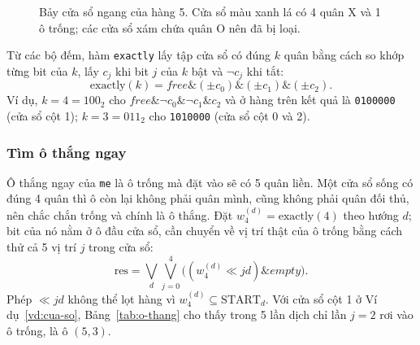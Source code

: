 \begin{figure}[H]
  \centering
  
  \caption{Bảy cửa sổ ngang của hàng 5. Cửa sổ màu xanh lá có 4 quân X và 1 ô trống; các cửa sổ xám chứa quân O nên đã bị loại.}
  \label{fig:cua-so}
\end{figure}

\begin{table}[H]
  \centering\small
  \caption{Các vòng cộng của \texttt{window\_counts} cho hàng 5, giá trị sau mỗi vòng. Mỗi chuỗi 7 ký tự là bit của 7 cửa sổ, cột 0 ở bên trái (không phải thứ tự viết số nhị phân thông thường).}
  \label{tab:cong}
  
\end{table}

Từ các bộ đếm, hàm \texttt{exactly} lấy tập cửa sổ có đúng $k$ quân bằng cách so khớp từng bit của $k$, lấy $c_j$ khi bit $j$ của $k$ bật và $\lnot c_j$ khi tắt:
\begin{equation}
  \mathrm{exactly}(k) = \mathit{free} \mathbin{\&} (\pm c_0) \mathbin{\&} (\pm c_1) \mathbin{\&} (\pm c_2).
\end{equation}
Ví dụ, $k = 4 = 100_2$ cho $\mathit{free} \mathbin{\&} \lnot c_0 \mathbin{\&} \lnot c_1 \mathbin{\&} c_2$ và ở hàng trên kết quả là \texttt{0100000} (cửa sổ cột 1); $k = 3 = 011_2$ cho \texttt{1010000} (cửa sổ cột 0 và 2).

\subsubsection{Tìm ô thắng ngay}
\label{sec:engine-o-thang}
Ô thắng ngay của \texttt{me} là ô trống mà đặt vào sẽ có 5 quân liền. Một cửa sổ sống có đúng 4 quân thì ô còn lại không phải quân mình, cũng không phải quân đối thủ, nên chắc chắn trống và chính là ô thắng. Đặt $w_4^{(d)} = \mathrm{exactly}(4)$ theo hướng $d$; bit của nó nằm ở ô đầu cửa sổ, cần chuyển về vị trí thật của ô trống bằng cách thử cả 5 vị trí $j$ trong cửa sổ:
\begin{equation}
  \mathrm{res} = \bigvee_{d} \bigvee_{j=0}^{4} \bigl((w_4^{(d)} \ll jd) \mathbin{\&} \mathit{empty}\bigr).
\end{equation}
Phép $\ll jd$ không thể lọt hàng vì $w_4^{(d)} \subseteq \mathrm{START}_d$. Với cửa sổ cột 1 ở Ví dụ~\ref{vd:cua-so}, Bảng~\ref{tab:o-thang} cho thấy trong 5 lần dịch chỉ lần $j = 2$ rơi vào ô trống, là ô $(5, 3)$.

\begin{table}[H]
  \centering\small
  \caption{Đưa cửa sổ $w_4$ (bit 56) về ô trống bên trong nó, với $d = 1$.}
  \label{tab:o-thang}
  
\end{table}

